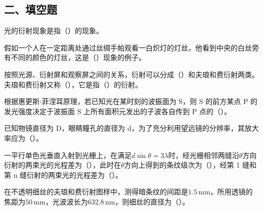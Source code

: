 \documentclass[standard, analysis, notocnum]{ExBook}
\newcommand{\answerarea}[1][8cm]{%
  \par\vspace{2mm}%
  \noindent{\color{themeColor!35}\rule{\linewidth}{0.4pt}}\par
  \noindent\begin{minipage}[t][#1][t]{\linewidth}\vspace{0pt}\end{minipage}\par
  \noindent{\color{themeColor!35}\rule{\linewidth}{0.4pt}}\par
}
\begin{document}
\subsection{二、填空题}
\begin{qitems}
\begin{bbox}
\qitem 光的衍射现象是指（\hspace{1.6em}）的现象。
\answerarea[3.5cm]
\end{bbox}
\begin{bbox}
\qitem 假如一个人在一定距离处通过丝绸手帕观看一白炽灯的灯丝，他看到中央的白丝旁有不同的颜色的灯丝，这是（\hspace{1.6em}）现象的例子。
\answerarea[3.5cm]
\end{bbox}
\begin{bbox}
\qitem 按照光源、衍射屏和观察屏之间的关系，衍射可以分成（\hspace{1.6em}）和夫琅和费衍射两类。夫琅和费衍射又称（\hspace{1.6em}），它是指（\hspace{1.6em}）的衍射。
\answerarea[3.5cm]
\end{bbox}
\begin{bbox}
\qitem 根据惠更斯-菲涅耳原理，若已知光在某时刻的波振面为 S，则 S 的前方某点 P 的发光强度决定于波振面 S 上所有面积元发出的子波各自传到 P 点的（\hspace{1.6em}）。
\answerarea[3.5cm]
\end{bbox}
\begin{bbox}
\qitem 已知物镜直径为 D，眼睛瞳孔的直径为 d，为了充分利用望远镜的分辨率，其放大率应为（\hspace{1.6em}）。
\answerarea[3.5cm]
\end{bbox}
\begin{bbox}
\qitem 一平行单色光垂直入射到光栅上，在满足$d\sin \theta =3\lambda$时，经光栅相邻两缝沿$\theta$方向衍射的两束光的光程差为（\hspace{1.6em}），此时在$\theta$方向上得到的条纹级次为（\hspace{1.6em}），经第 1 缝和第 n 缝衍射的两束光的光程差为（\hspace{1.6em}）。
\answerarea[3.5cm]
\end{bbox}
\begin{bbox}
\qitem 在不透明细丝的夫琅和费衍射图样中，测得暗条纹的间距是$1.5\,\mathrm{mm}$，所用透镜的焦距为$50\,\mathrm{mm}$，光波波长为$632.8\,\mathrm{nm}$，则细丝的直径为（\hspace{1.6em}）。
\answerarea[3.5cm]
\end{bbox}
\begin{bbox}

\end{bbox}
\end{qitems}
\end{document}
